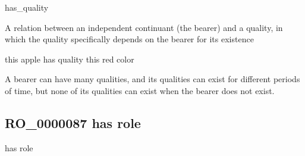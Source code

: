 \documentclass[letterpaper,10pt,english]{sphinxmanual}
\begin{document}
\begin{sphinxShadowBox}

\sphinxAtStartPar
has\_quality
\end{sphinxShadowBox}

\begin{sphinxShadowBox}

\sphinxAtStartPar
{\hyperref[\detokenize{doc-RO_0000053::doc}]{}}
\end{sphinxShadowBox}

\begin{sphinxShadowBox}

\sphinxAtStartPar
A relation between an independent continuant (the bearer) and a quality, in which the quality specifically depends on the bearer for its existence
\end{sphinxShadowBox}

\begin{sphinxShadowBox}

\sphinxAtStartPar
this apple has quality this red color
\end{sphinxShadowBox}

\begin{sphinxShadowBox}

\sphinxAtStartPar
A bearer can have many qualities, and its qualities can exist for different periods of time, but none of its qualities can exist when the bearer does not exist.
\end{sphinxShadowBox}

\begin{sphinxShadowBox}

\sphinxAtStartPar
{}
\end{sphinxShadowBox}
\begin{quote}

\ignorespaces \end{quote}


\subsection{RO\_0000087 \sphinxhyphen{} has role}
\label{\detokenize{doc-RO_0000087:ro-0000087-has-role}}\label{\detokenize{doc-RO_0000087:index-0}}\label{\detokenize{doc-RO_0000087::doc}}
\begin{sphinxShadowBox}

\sphinxAtStartPar
has role
\end{sphinxShadowBox}
\end{document}
